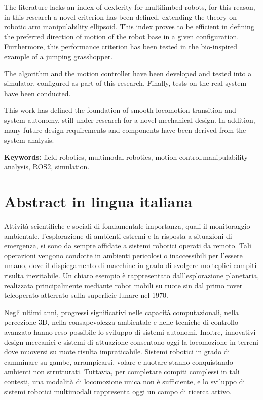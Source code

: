 The literature lacks an index of dexterity for multilimbed robots, for this reason, in this research a novel criterion has been defined, extending the theory on robotic arm manipulability ellipsoid. This index proves to be efficient in defining the preferred direction of motion of the robot base in a given configuration. Furthermore, this performance criterion has been tested in the bio-inspired example of a jumping grasshopper. 

The algorithm and the motion controller have been developed and tested into a simulator, configured as part of this research. Finally, tests on the real system have been conducted.

This work has defined the foundation of smooth locomotion transition and system autonomy, still under research for a novel mechanical design. In addition, many future design requirements and components have been derived from the system analysis. 



\vspace{0.5em}
\noindent\textbf{Keywords:} field robotics, multimodal robotics, motion control,manipulability analysis, ROS2, simulation.%


\chapter*{Abstract in lingua italiana}
Attività scientifiche e sociali di fondamentale importanza, quali il monitoraggio ambientale, l’esplorazione di ambienti estremi e la risposta a situazioni di emergenza, si sono da sempre affidate a sistemi robotici operati da remoto. Tali operazioni vengono condotte in ambienti pericolosi o inaccessibili per l’essere umano, dove il dispiegamento di macchine in grado di svolgere molteplici compiti risulta inevitabile. Un chiaro esempio è rappresentato dall’esplorazione planetaria, realizzata principalmente mediante robot mobili su ruote sin dal primo rover teleoperato atterrato sulla superficie lunare nel 1970.

Negli ultimi anni, progressi significativi nelle capacità computazionali, nella percezione 3D, nella consapevolezza ambientale e nelle tecniche di controllo avanzato hanno reso possibile lo sviluppo di sistemi autonomi. Inoltre, innovativi design meccanici e sistemi di attuazione consentono oggi la locomozione in terreni dove muoversi su ruote risulta impraticabile. Sistemi robotici in grado di camminare su gambe, arrampicarsi, volare e nuotare stanno conquistando ambienti non strutturati. Tuttavia, per completare compiti complessi in tali contesti, una modalità di locomozione unica non è sufficiente, e lo sviluppo di sistemi robotici multimodali rappresenta oggi un campo di ricerca attivo.

